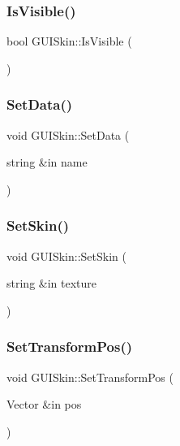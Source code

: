 \hypertarget{class_g_u_i_skin_a8ec0b4bdfbe48e725eb2edf887ae5b35}{}\label{class_g_u_i_skin_a8ec0b4bdfbe48e725eb2edf887ae5b35} 
\subsubsection{\texorpdfstring{Is\+Visible()}{IsVisible()}}
{\footnotesize\ttfamily bool G\+U\+I\+Skin\+::\+Is\+Visible (\begin{DoxyParamCaption}{ }\end{DoxyParamCaption})}

\hypertarget{class_g_u_i_skin_a30841995921d05b436a86bc2393d7732}{}\label{class_g_u_i_skin_a30841995921d05b436a86bc2393d7732} 
\subsubsection{\texorpdfstring{Set\+Data()}{SetData()}}
{\footnotesize\ttfamily void G\+U\+I\+Skin\+::\+Set\+Data (\begin{DoxyParamCaption}\item[{string \&in}]{name }\end{DoxyParamCaption})}

\hypertarget{class_g_u_i_skin_ac4161997a904d92cf66d3d7ee0698110}{}\label{class_g_u_i_skin_ac4161997a904d92cf66d3d7ee0698110} 
\subsubsection{\texorpdfstring{Set\+Skin()}{SetSkin()}}
{\footnotesize\ttfamily void G\+U\+I\+Skin\+::\+Set\+Skin (\begin{DoxyParamCaption}\item[{string \&in}]{texture }\end{DoxyParamCaption})}

\hypertarget{class_g_u_i_skin_ab4890e1885de02bb750790bc94561849}{}\label{class_g_u_i_skin_ab4890e1885de02bb750790bc94561849} 
\subsubsection{\texorpdfstring{Set\+Transform\+Pos()}{SetTransformPos()}}
{\footnotesize\ttfamily void G\+U\+I\+Skin\+::\+Set\+Transform\+Pos (\begin{DoxyParamCaption}\item[{Vector \&in}]{pos }\end{DoxyParamCaption})}

